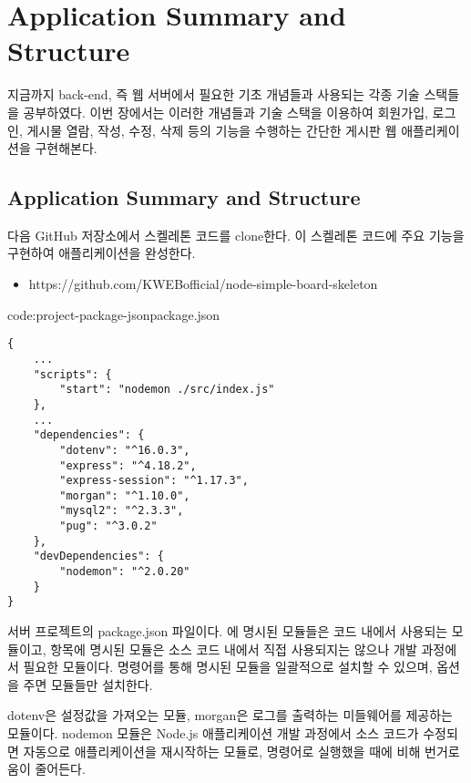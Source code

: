 \section{Application Summary and Structure}\label{sect:web-app-summary}

지금까지 back-end, 즉 웹 서버에서 필요한 기초 개념들과 사용되는 각종 기술 스택들을 공부하였다. 이번 장에서는 이러한 개념들과 기술 스택을 이용하여 회원가입, 로그인, 게시물 열람, 작성, 수정, 삭제 등의 기능을 수행하는 간단한 게시판 웹 애플리케이션을 구현해본다.

\subsection*{Application Summary and Structure}

다음 GitHub 저장소에서 스켈레톤 코드를 clone한다. 이 스켈레톤 코드에 주요 기능을 구현하여 애플리케이션을 완성한다.

\begin{itemize}
    \item https://github.com/KWEBofficial/node-simple-board-skeleton
\end{itemize}

\begin{code}{code:project-package-json}{package.json}
\begin{verbatim}
{
    ...
    "scripts": {
        "start": "nodemon ./src/index.js"
    },
    ...
    "dependencies": {
        "dotenv": "^16.0.3",
        "express": "^4.18.2",
        "express-session": "^1.17.3",
        "morgan": "^1.10.0",
        "mysql2": "^2.3.3",
        "pug": "^3.0.2"
    },
    "devDependencies": {
        "nodemon": "^2.0.20"
    }
}
\end{verbatim}
\end{code}

\은 서버 프로젝트의 package.json 파일이다. 에 명시된 모듈들은 코드 내에서 사용되는 모듈이고,  항목에 명시된 모듈은 소스 코드 내에서 직접 사용되지는 않으나 개발 과정에서 필요한 모듈이다.  명령어를 통해 명시된 모듈을 일괄적으로 설치할 수 있으며,  옵션을 주면  모듈들만 설치한다.

dotenv은 설정값을 가져오는 모듈, morgan은 로그를 출력하는 미들웨어를 제공하는 모듈이다. nodemon 모듈은 Node.js 애플리케이션 개발 과정에서 소스 코드가 수정되면 자동으로 애플리케이션을 재시작하는 모듈로,  명령어로 실행했을 때에 비해 번거로움이 줄어든다.
\clearpage

